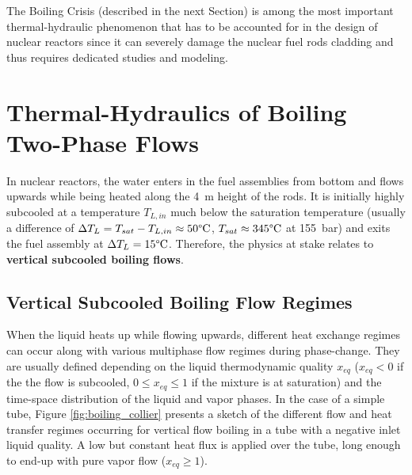 \npar

The Boiling Crisis (described in the next Section) is among the most important thermal-hydraulic phenomenon that has to be accounted for in the design of nuclear reactors since it can severely damage the nuclear fuel rods cladding and thus requires dedicated studies and modeling. %


\section{Thermal-Hydraulics of Boiling Two-Phase Flows}

In nuclear reactors, the water enters in the fuel assemblies from bottom and flows upwards while being heated along the 4~m height of the rods. It is initially highly subcooled \ie at a temperature $T_{L,in}$ much below the saturation temperature (usually a difference of $\Delta T_{L} = T_{sat}-T_{L,in} \approx 50 \degree\mathrm{C}$, $T_{sat} \approx 345\degree\mathrm{C}$ at 155\ bar) and exits the fuel assembly at $\Delta T_{L} = 15\degree\mathrm{C}$. Therefore, the physics at stake relates to \textbf{vertical subcooled boiling flows}.


\subsection{Vertical Subcooled Boiling Flow Regimes}

When the liquid heats up while flowing upwards, different heat exchange regimes can occur along with various multiphase flow regimes during phase-change. They are usually defined depending on the liquid thermodynamic quality $x_{eq}$ ($x_{eq}<0$ if the the flow is subcooled, $0 \leq x_{eq} \leq 1$ if the mixture is at saturation) and the time-space distribution of the liquid and vapor phases. In the case of a simple tube, Figure \ref{fig:boiling_collier} presents a sketch of the different flow and heat transfer regimes occurring for vertical flow boiling in a tube with a negative inlet liquid quality. A low but constant heat flux is applied over the tube, long enough to end-up with pure vapor flow ($x_{eq} \geq 1$).


